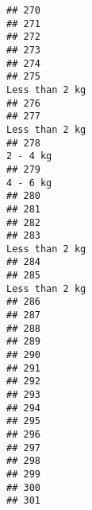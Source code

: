 \documentclass[
]{article}
\begin{document}
\begin{verbatim}
## 270                                                                            
## 271                                                                            
## 272                                                                            
## 273                                                                            
## 274                                                                            
## 275                                                              Less than 2 kg
## 276                                                                            
## 277                                                              Less than 2 kg
## 278                                                                    2 - 4 kg
## 279                                                                    4 - 6 kg
## 280                                                                            
## 281                                                                            
## 282                                                                            
## 283                                                              Less than 2 kg
## 284                                                                            
## 285                                                              Less than 2 kg
## 286                                                                            
## 287                                                                            
## 288                                                                            
## 289                                                                            
## 290                                                                            
## 291                                                                            
## 292                                                                            
## 293                                                                            
## 294                                                                            
## 295                                                                            
## 296                                                                            
## 297                                                                            
## 298                                                                            
## 299                                                                            
## 300                                                                            
## 301                                                                            

\end{verbatim}
\end{document}
